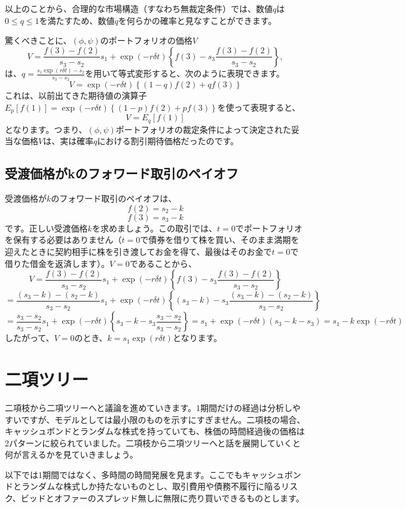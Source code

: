 \documentclass[uplatex,a4j,12pt,dvipdfmx]{jsarticle}
\begin{document}
以上のことから、合理的な市場構造（すなわち無裁定条件）では、数値$q$は$0 \le q \le 1$を満たすため、数値$q$を何らかの確率と見なすことができます。

驚くべきことに、$(\phi, \psi)$のポートフォリオの価格$V$\[V = \frac{f(3) - f(2)}{s_3 - s_2} s_1 + \exp(-r\delta t) \left\{ f(3) - s_3 \frac{f(3) - f(2)}{s_3 - s_2} \right\},\]は、$q = \frac{s_1 \exp(r\delta t) - s_2}{s_3 - s_2}$を用いて等式変形すると、次のように表現できます。
\[V = \exp(-r\delta t) \left\{ (1-q)f(2) + qf(3) \right\}\]
これは、以前出てきた期待値の演算子$E_p[f(1)] = \exp(-r\delta t) \left\{ (1-p)f(2) + pf(3) \right\}$を使って表現すると、\[V = E_q[f(1)]\]となります。つまり、$(\phi, \psi)$ポートフォリオの裁定条件によって決定された妥当な価格$V$は、実は確率$q$における割引期待価格だったのです。

\subsection{受渡価格がkのフォワード取引のペイオフ}
受渡価格が$k$のフォワード取引のペイオフは、
\[f(2) = s_2 - k\]
\[f(3) = s_3 - k\]
です。正しい受渡価格$k$を求めましょう。この取引では、$t=0$でポートフォリオを保有する必要はありません（$t=0$で債券を借りて株を買い、そのまま満期を迎えたときに契約相手に株を引き渡してお金を得て、最後はそのお金で$t=0$で借りた借金を返済します）。$V=0$であることから、
\[V = \frac{f(3) - f(2)}{s_3 - s_2} s_1 + \exp(-r\delta t) \left\{ f(3) - s_3 \frac{f(3) - f(2)}{s_3 - s_2} \right\} \]
\[= \frac{(s_3-k) - (s_2-k)}{s_3 - s_2} s_1 + \exp(-r\delta t) \left\{ (s_3-k) - s_3 \frac{(s_3-k) - (s_2-k)}{s_3 - s_2} \right\}\]
\[= \frac{s_3 - s_2}{s_3 - s_2} s_1 + \exp(-r\delta t) \left\{ s_3 - k - s_3 \frac{s_3 - s_2}{s_3 - s_2} \right\} = s_1 + \exp(-r\delta t) (s_3 - k - s_3) = s_1 - k \exp(-r\delta t)\]
したがって、$V=0$のとき、$k = s_1 \exp(r\delta t)$となります。

\section{二項ツリー}

二項枝から二項ツリーへと議論を進めていきます。1期間だけの経過は分析しやすいですが、モデルとしては最小限のものを示すにすぎません。二項枝の場合、キャッシュボンドとランダムな株式を持っていても、株価の時間経過後の価格は2パターンに絞られていました。二項枝から二項ツリーへと話を展開していくと何が言えるかを見ていきましょう。

以下では1期間ではなく、多時間の時間発展を見ます。ここでもキャッシュボンドとランダムな株式しか持たないものとし、取引費用や債務不履行に陥るリスク、ビッドとオファーのスプレッド無しに無限に売り買いできるものとします。
\end{document}
